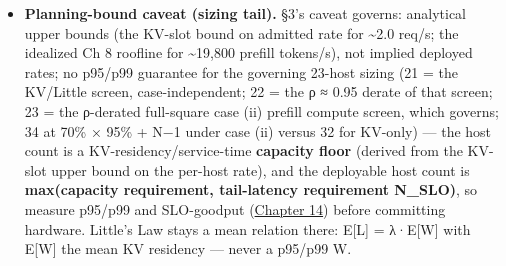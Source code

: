 \begin{itemize}
  made.
\item
  \textbf{Planning-bound caveat (sizing tail).} §3's caveat governs:
  analytical upper bounds (the KV-slot bound on admitted rate for
  \textasciitilde2.0 req/s; the idealized Ch 8 roofline for
  \textasciitilde19,800 prefill tokens/s), not implied deployed rates;
  no p95/p99 guarantee for the governing 23-host sizing (21 = the
  KV/Little screen, case-independent; 22 = the ρ ≈ 0.95 derate of that
  screen; 23 = the ρ-derated full-square case (ii) prefill compute
  screen, which governs; 34 at 70\% × 95\% + N−1 under case (ii) versus
  32 for KV-only) --- the host count is a KV-residency/service-time
  \textbf{capacity floor} (derived from the KV-slot upper bound on the
  per-host rate), and the deployable host count is \textbf{max(capacity
  requirement, tail-latency requirement N\_SLO)}, so measure p95/p99 and
  SLO-goodput (\hyperref[chap:14]{Chapter 14}) before committing hardware. Little's Law
  stays a mean relation there: E\mbox{{[}L{]}} = λ·E\mbox{{[}W{]}} with E\mbox{{[}W{]}} the
  mean KV residency --- never a p95/p99 W.
\end{itemize}


